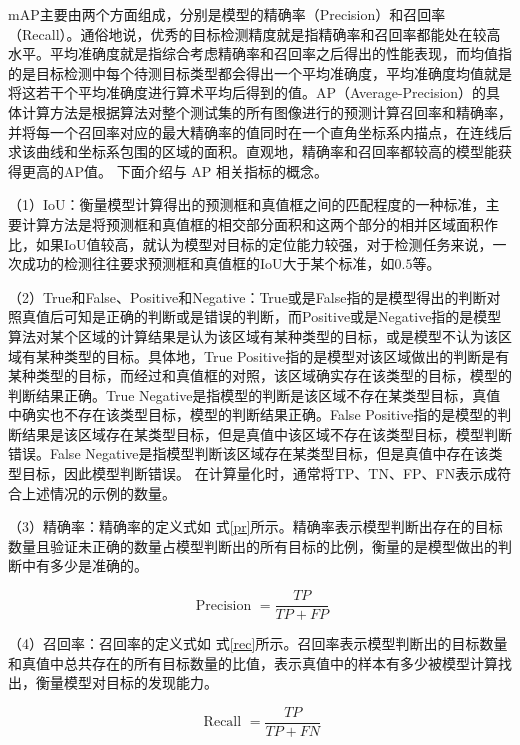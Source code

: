 mAP主要由两个方面组成，分别是模型的精确率（Precision）和召回率（Recall）。通俗地说，优秀的目标检测精度就是指精确率和召回率都能处在较高水平。平均准确度就是指综合考虑精确率和召回率之后得出的性能表现，而均值指的是目标检测中每个待测目标类型都会得出一个平均准确度，平均准确度均值就是将这若干个平均准确度进行算术平均后得到的值。AP（Average-Precision）的具体计算方法是根据算法对整个测试集的所有图像进行的预测计算召回率和精确率，并将每一个召回率对应的最大精确率的值同时在一个直角坐标系内描点，在连线后求该曲线和坐标系包围的区域的面积。直观地，精确率和召回率都较高的模型能获得更高的AP值。
下面介绍与 AP 相关指标的概念。

（1）IoU：衡量模型计算得出的预测框和真值框之间的匹配程度的一种标准，主要计算方法是将预测框和真值框的相交部分面积和这两个部分的相并区域面积作比，如果IoU值较高，就认为模型对目标的定位能力较强，对于检测任务来说，一次成功的检测往往要求预测框和真值框的IoU大于某个标准，如$0.5$等。

（2）True和False、Positive和Negative：True或是False指的是模型得出的判断对照真值后可知是正确的判断或是错误的判断，而Positive或是Negative指的是模型算法对某个区域的计算结果是认为该区域有某种类型的目标，或是模型不认为该区域有某种类型的目标。具体地，True Positive指的是模型对该区域做出的判断是有某种类型的目标，而经过和真值框的对照，该区域确实存在该类型的目标，模型的判断结果正确。True Negative是指模型的判断是该区域不存在某类型目标，真值中确实也不存在该类型目标，模型的判断结果正确。False Positive指的是模型的判断结果是该区域存在某类型目标，但是真值中该区域不存在该类型目标，模型判断错误。False Negative是指模型判断该区域存在某类型目标，但是真值中存在该类型目标，因此模型判断错误。
在计算量化时，通常将TP、TN、FP、FN表示成符合上述情况的示例的数量。

（3）精确率：精确率的定义式如
式\ref{pr}所示。精确率表示模型判断出存在的目标数量且验证未正确的数量占模型判断出的所有目标的比例，衡量的是模型做出的判断中有多少是准确的。

\begin{equation}
     \text { Precision }=\frac{T P}{T P+F P}
    \label{pr}
\end{equation}

（4）召回率：召回率的定义式如
式\ref{rec}所示。召回率表示模型判断出的目标数量和真值中总共存在的所有目标数量的比值，表示真值中的样本有多少被模型计算找出，衡量模型对目标的发现能力。

\begin{equation}
     \text { Recall }=\frac{T P}{T P+F N}
    \label{rec}
\end{equation}

